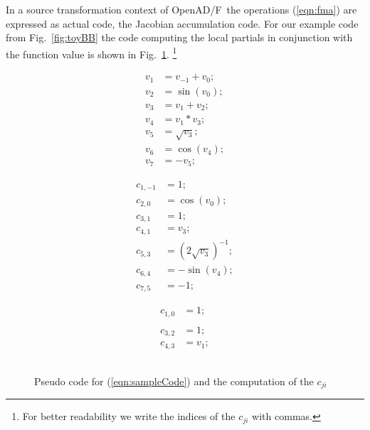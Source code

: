 \documentclass{book}
\newcommand{\OpenADF}{OpenAD/F}
\newcommand{\reffig}[1]{{Fig.~\ref{#1}}}
\newcommand{\refeqn}[1]{{(\ref{#1})}}
\begin{document}
In a source transformation context of \OpenADF\ the operations \refeqn{eqn:fma} are 
expressed as actual code, the Jacobian accumulation code. For our example code 
from \reffig{fig:toyBB} the code computing 
the local partials in conjunction with the function value 
is shown in 
\reffig{fig:toyAndPartials}.
\footnote{
  For better readability we write the indices of the $c_{ji}$ with commas.
} 
\begin{figure}
  \begin{center}
    \begin{minipage}{.3\linewidth}
      \begin{align*}
        v_1&=v_{-1}+v_0; \\
        v_2&=\sin(v_0); \\
        v_3&=v_1+v_2; \\
        v_4&=v_1*v_3; \\
        v_5&=\sqrt{v_3};\\
        v_6&=\cos(v_4); \\
        v_7&=-v_5;
      \end{align*}
    \end{minipage}
    \begin{minipage}{.3\linewidth}
      \begin{align*}
        c_{1,-1}&=1; \\
        c_{2,0}&=\cos(v_0); \\
        c_{3,1}&=1; \\
        c_{4,1}&=v_3; \\
        c_{5,3}&=(2\sqrt{v_3})^{-1}; \\
        c_{6,4}&=-\sin(v_4); \\
        c_{7,5}&=-1;
      \end{align*}
    \end{minipage}
    \begin{minipage}{.2\linewidth}
      \begin{align*}
        c_{1,0}&=1; \\
        &\\
        c_{3,2}&=1; \\
        c_{4,3}&=v_1; \\
        &\\
        &\\
        &
      \end{align*}
    \end{minipage}
  \end{center}	
  \caption{Pseudo code for \refeqn{eqn:sampleCode} and the computation of the $c_{ji}$}\label{fig:toyAndPartials}
\end{figure}
\end{document}
